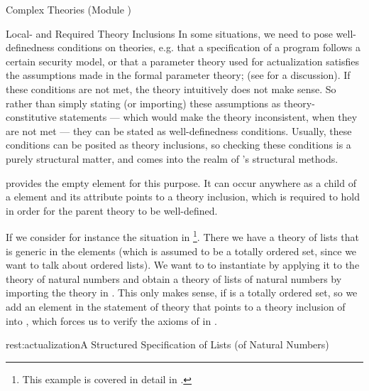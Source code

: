 \begin{tchapter}[id=complex-theories,short=Complex Theories]{Complex Theories (Module
    )}
\begin{tsection}[id=restricting-inference,short=Local/Required Theory Inclusions]{Local- and Required Theory Inclusions}
  In some situations, we need to pose well-definedness conditions on theories,
  e.g. that a specification of a program follows a certain security model, or that
  a parameter theory used for actualization satisfies the assumptions made in the
  formal parameter theory; (see  for a discussion). If these
  conditions are not met, the theory intuitively does not make sense. So rather
  than simply stating (or importing) these assumptions as theory-constitutive
  statements --- which would make the theory inconsistent, when they are not met
  --- they can be stated as well-definedness conditions. Usually, these conditions
  can be posited as theory inclusions, so checking these conditions is a purely
  structural matter, and comes into the realm of \omdoc's structural methods.

  \omdoc provides the empty  element for this purpose. It can
  occur anywhere as a child of a  element and its
   attribute points to a theory inclusion, which is
  required to hold in order for the parent theory to be well-defined.
  
  If we consider for instance the situation in
  \footnote{This example is covered in detail in
    .}.  There we have a theory  of lists that is
  generic in the elements (which is assumed to be a totally ordered set, since we want to
  talk about ordered lists). We want to to instantiate  by applying it
  to the theory  of natural numbers and obtain a theory
   of lists of natural numbers by importing the theory
   in . This only makes sense, if
   is a totally ordered set, so we add an  element
  in the statement of theory  that points to a theory inclusion of
   into , which forces us to verify the axioms of
   in .

\begin{myfig}{rest:actualization}{A Structured Specification of Lists (of
    Natural Numbers)}
  \begin{tikzpicture}\end{tikzpicture}\quad
\end{myfig}


\end{tsection}
\end{tchapter}
